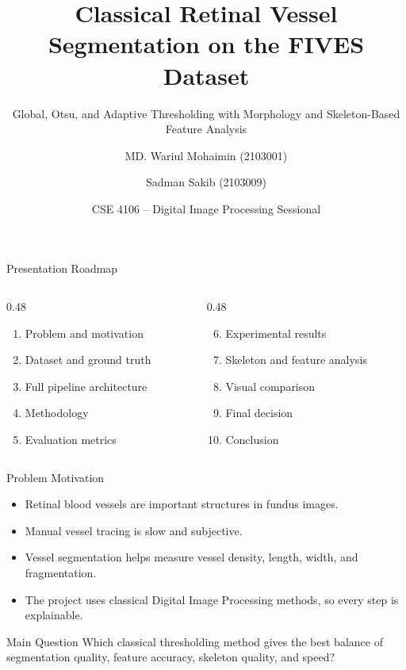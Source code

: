 \documentclass[aspectratio=169,11pt]{beamer}
\title[Retinal Vessel Segmentation]{Classical Retinal Vessel Segmentation on the FIVES Dataset}
\subtitle{Global, Otsu, and Adaptive Thresholding with Morphology and Skeleton-Based Feature Analysis}
\author[Group 05]{MD. Wariul Mohaimin (2103001) \and Sadman Sakib (2103009)}
\institute[RUET]{Department of Computer Science \& Engineering\\Rajshahi University of Engineering \& Technology}
\date{CSE 4106 -- Digital Image Processing Sessional}
\begin{document}
\begin{frame}
  \titlepage
\end{frame}

\begin{frame}{Presentation Roadmap}
  \begin{columns}[T]
    \begin{column}{0.48\textwidth}
      \begin{enumerate}
        \item Problem and motivation
        \item Dataset and ground truth
        \item Full pipeline architecture
        \item Methodology
        \item Evaluation metrics
      \end{enumerate}
    \end{column}
    \begin{column}{0.48\textwidth}
      \begin{enumerate}
        \setcounter{enumi}{5}
        \item Experimental results
        \item Skeleton and feature analysis
        \item Visual comparison
        \item Final decision
        \item Conclusion
      \end{enumerate}
    \end{column}
  \end{columns}
\end{frame}

\begin{frame}{Problem Motivation}
  \begin{itemize}
    \item Retinal blood vessels are important structures in fundus images.
    \item Manual vessel tracing is slow and subjective.
    \item Vessel segmentation helps measure vessel density, length, width, and fragmentation.
    \item The project uses classical Digital Image Processing methods, so every step is explainable.
  \end{itemize}
  \vspace{0.3cm}
  \begin{block}{Main Question}
    Which classical thresholding method gives the best balance of segmentation quality, feature accuracy, skeleton quality, and speed?
  \end{block}
\end{frame}
\end{document}
